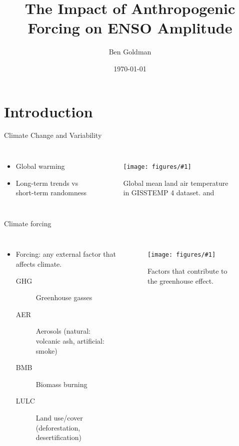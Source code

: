 \documentclass{beamer}
\title{The Impact of Anthropogenic Forcing on ENSO Amplitude}
\author{Ben Goldman}
\date{\today}
\newcommand{\myfig}[3]{
  \begin{figure}
    \centering
    \texttt{[image: figures/\#1]}
    \caption{#2}
    \label{fig:#3}
  \end{figure}
}
\begin{document}
\maketitle

\section{Introduction}

\begin{frame}{Climate Change and Variability}
  \begin{columns}
    \begin{itemize}
    \item Global warming
    \item Long-term trends vs short-term randomness
    \end{itemize}
    \myfig{intro_fig_3.pdf}{Global mean land air temperature in GISSTEMP 4 dataset. \citep{gistemp2019giss} and \citep{lenssen2019improvements}}{this}
  \end{columns}
\end{frame}

\begin{frame}{Climate forcing}
  \begin{columns}
    \begin{itemize}
    \item \alert{Forcing}: any external factor that affects climate.
      \begin{description}
      \item[\alert{GHG}] Greenhouse gasses
      \item[\alert{AER}] Aerosols (natural: volcanic ash, artificial: smoke)
      \item[\alert{BMB}] Biomass burning
      \item[\alert{LULC}] Land use/cover (deforestation, desertification)
      \end{description}
    \end{itemize}
    \myfig{greenhouse_Effect.jpg}{Factors that contribute to the greenhouse effect.}{this}
  \end{columns}
\end{frame}
\end{document}
